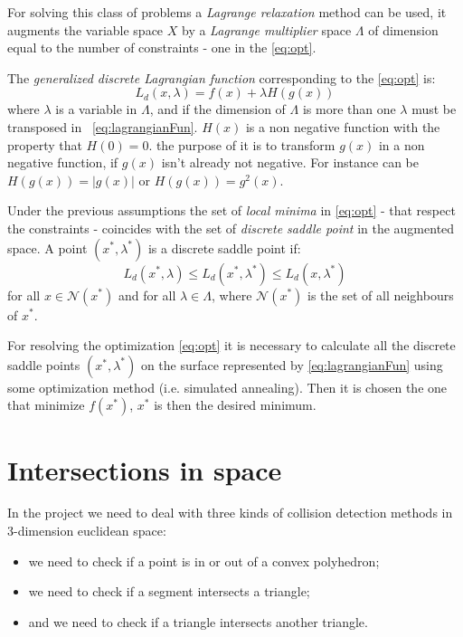 \documentclass[dissertation.tex]{subfiles}
\begin{document}
For solving this class
of problems a \emph{Lagrange relaxation} method can be used, it
augments the variable space $X$ by a \emph{Lagrange multiplier} space
$\Lambda$ of dimension equal to the number of constraints - one in the
\cref{eq:opt}.

The \emph{generalized discrete Lagrangian
  function} corresponding to the \cref{eq:opt} is:
\begin{equation}\label{eq:lagrangianFun}
  L_d(x,\lambda)=f(x)+\lambda H(g(x))
\end{equation}
where $\lambda$ is a variable in $\Lambda$, and if the dimension of
$\Lambda$ is more than one $\lambda$ must be transposed in
~\cref{eq:lagrangianFun}. $H(x)$ is a non negative function
with the property that $H(0)=0$. the purpose of it is to transform $g(x)$ in
a non negative function, if $g(x)$ isn't already not negative. For
instance can be $H(g(x))=|g(x)|$ or $H(g(x))=g^2(x)$.

Under the previous assumptions the set of \emph{local minima}
in \cref{eq:opt} - that respect the constraints -  coincides
with the set of \emph{discrete saddle point}
in the augmented space. A point $(x^*,\lambda^*)$ is a discrete saddle
point if:
\begin{equation*}
  L_d(x^*,\lambda)\leq L_d(x^*,\lambda^*)\leq L_d(x,\lambda^*)
\end{equation*}
for all $x\in\mathcal{N}(x^*)$ and for all $\lambda\in\Lambda$, where
$\mathcal{N}(x^*)$ is the set of all neighbours of $x^*$.

For resolving the optimization \cref{eq:opt} it is necessary to
calculate all the discrete saddle points $(x^*,\lambda^*)$ on the surface
represented by
\cref{eq:lagrangianFun} using some
optimization method (i.e. simulated annealing). Then it is chosen
the one that minimize $f(x^*)$, $x^*$ is then the desired minimum.

\section{Intersections in space}\label{sec:intersections}
In the project we need to deal with three kinds of collision detection
methods in 3-dimension euclidean space:
\begin{itemize}
\item we need to check if a point is in or out
  of a convex polyhedron;
\item we need to check if a segment intersects a triangle;
\item and we need to check if a
  triangle intersects another triangle.
\end{itemize}
\end{document}
